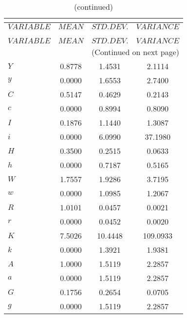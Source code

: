  
\begin{center}
\begin{longtable}{lccc} 
\caption{THEORETICAL MOMENTS}\\
 \label{Table:th_moments}\\
\toprule 
$VARIABLE  $	 & 	 $         MEAN$	 & 	 $    STD. DEV.$	 & 	 $     VARIANCE$\\
\midrule \endfirsthead 
\caption{(continued)}\\
 \toprule \\ 
$VARIABLE  $	 & 	 $         MEAN$	 & 	 $    STD. DEV.$	 & 	 $     VARIANCE$\\
\midrule \endhead 
\midrule \multicolumn{4}{r}{(Continued on next page)} \\ \bottomrule \endfoot 
\bottomrule \endlastfoot 
$Y         $	 & 	       0.8778	 & 	       1.4531	 & 	       2.1114 \\ 
$y         $	 & 	       0.0000	 & 	       1.6553	 & 	       2.7400 \\ 
$C         $	 & 	       0.5147	 & 	       0.4629	 & 	       0.2143 \\ 
$c         $	 & 	       0.0000	 & 	       0.8994	 & 	       0.8090 \\ 
$I         $	 & 	       0.1876	 & 	       1.1440	 & 	       1.3087 \\ 
$i         $	 & 	       0.0000	 & 	       6.0990	 & 	      37.1980 \\ 
$H         $	 & 	       0.3500	 & 	       0.2515	 & 	       0.0633 \\ 
$h         $	 & 	       0.0000	 & 	       0.7187	 & 	       0.5165 \\ 
$W         $	 & 	       1.7557	 & 	       1.9286	 & 	       3.7195 \\ 
$w         $	 & 	       0.0000	 & 	       1.0985	 & 	       1.2067 \\ 
$R         $	 & 	       1.0101	 & 	       0.0457	 & 	       0.0021 \\ 
$r         $	 & 	       0.0000	 & 	       0.0452	 & 	       0.0020 \\ 
$K         $	 & 	       7.5026	 & 	      10.4448	 & 	     109.0933 \\ 
$k         $	 & 	       0.0000	 & 	       1.3921	 & 	       1.9381 \\ 
$A         $	 & 	       1.0000	 & 	       1.5119	 & 	       2.2857 \\ 
$a         $	 & 	       0.0000	 & 	       1.5119	 & 	       2.2857 \\ 
$G         $	 & 	       0.1756	 & 	       0.2654	 & 	       0.0705 \\ 
$g         $	 & 	       0.0000	 & 	       1.5119	 & 	       2.2857 \\ 
\end{longtable}
 \end{center}
